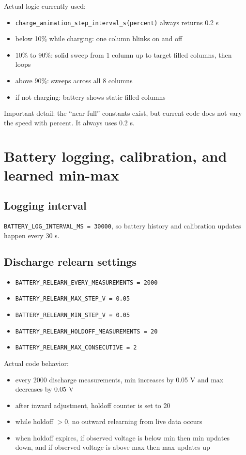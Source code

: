 \documentclass[11pt]{article}
\begin{document}
Actual logic currently used:
\begin{itemize}
  \item \texttt{charge\_animation\_step\_interval\_s(percent)} always returns 0.2 s
  \item below 10\% while charging: one column blinks on and off
  \item 10\% to 90\%: solid sweep from 1 column up to target filled columns, then loops
  \item above 90\%: sweeps across all 8 columns
  \item if not charging: battery shows static filled columns
\end{itemize}

Important detail: the ``near full'' constants exist, but current code does not vary the speed with percent. It always uses 0.2 s.

\section{Battery logging, calibration, and learned min-max}
\subsection{Logging interval}
\texttt{BATTERY\_LOG\_INTERVAL\_MS = 30000}, so battery history and calibration updates happen every 30 s.

\subsection{Discharge relearn settings}
\begin{itemize}
  \item \texttt{BATTERY\_RELEARN\_EVERY\_MEASUREMENTS = 2000}
  \item \texttt{BATTERY\_RELEARN\_MAX\_STEP\_V = 0.05}
  \item \texttt{BATTERY\_RELEARN\_MIN\_STEP\_V = 0.05}
  \item \texttt{BATTERY\_RELEARN\_HOLDOFF\_MEASUREMENTS = 20}
  \item \texttt{BATTERY\_RELEARN\_MAX\_CONSECUTIVE = 2}
\end{itemize}

Actual code behavior:
\begin{itemize}
  \item every 2000 discharge measurements, min increases by 0.05 V and max decreases by 0.05 V
  \item after inward adjustment, holdoff counter is set to 20
  \item while holdoff $> 0$, no outward relearning from live data occurs
  \item when holdoff expires, if observed voltage is below min then min updates down, and if observed voltage is above max then max updates up
\end{itemize}
\end{document}
